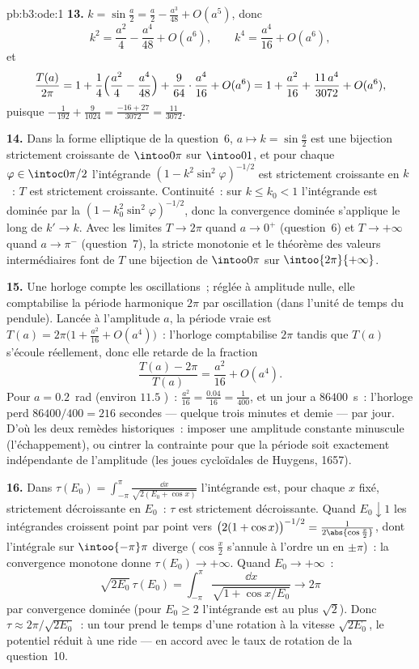 \begin{solution}{pb:b3:ode:1}
\textbf{13.} $k = \sin\frac a2 = \frac a2 - \frac{a^3}{48} +
O(a^5)$, donc
\[
k^2 = \frac{a^2}4 - \frac{a^4}{48} + O(a^6),
\qquad
k^4 = \frac{a^4}{16} + O(a^6) ,
\]
et
\[
\frac{T(a)}{2\pi} = 1 + \frac14\Bigl(\frac{a^2}4 -
\frac{a^4}{48}\Bigr) + \frac9{64}\cdot\frac{a^4}{16} +
O(a^6)
= 1 + \frac{a^2}{16} + \frac{11\,a^4}{3072} + O(a^6) ,
\]
puisque $-\frac1{192} + \frac9{1024} = \frac{-16 + 27}{3072}
= \frac{11}{3072}$.

\textbf{14.} Dans la forme elliptique de la question~6, $a
\mapsto k = \sin\frac a2$ est une bijection 
strictement croissante de $\intoo0\pi$ sur $\intoo01$, et
pour chaque $\varphi \in \intoc0{\pi/2}$ l'intégrande $(1 -
k^2\sin^2\varphi)^{-1/2}$ est strictement croissante en
$k$~: $T$ est strictement croissante. Continuité~: sur $k
\leq k_0 < 1$ l'intégrande est dominée par la  $(1 -
k_0^2\sin^2\varphi)^{-1/2}$, donc la convergence dominée
s'applique le long de $k' \to k$. Avec les limites $T \to
2\pi$ quand $a \to 0^+$ (question~6) et $T \to +\infty$ quand
$a \to \pi^-$ (question~7), la stricte monotonie et le
théorème des valeurs intermédiaires font de $T$ une bijection
de $\intoo0\pi$ sur $\intoo{2\pi}{+\infty}$.

\textbf{15.} Une horloge compte les oscillations~; réglée à
amplitude nulle, elle comptabilise la période harmonique
$2\pi$ par oscillation (dans l'unité de temps du pendule).
Lancée à l'amplitude $a$, la période vraie est $T(a) =
2\pi\bigl(1 + \frac{a^2}{16} + O(a^4)\bigr)$~: l'horloge
comptabilise $2\pi$ tandis que $T(a)$ s'écoule réellement,
donc elle retarde de la fraction
\[
\frac{T(a) - 2\pi}{T(a)} = \frac{a^2}{16} + O(a^4) .
\]
Pour $a = 0.2$~rad (environ $11.5$ )~: $\frac{a^2}{16}
= \frac{0.04}{16} = \frac1{400}$, et un jour a $86400$~s~:
l'horloge perd $86400/400 = 216$ secondes --- quelque trois
minutes et demie --- par jour. D'où les deux remèdes
historiques~: imposer une amplitude constante minuscule
(l'échappement), ou cintrer la contrainte pour que la période
soit exactement indépendante de l'amplitude (les joues
cycloïdales de Huygens, 1657).

\textbf{16.} Dans $\tau(E_0) = \int_{-\pi}^{\pi}\frac{\dd
x}{\sqrt{2(E_0 + \cos x)}}$ l'intégrande est, pour chaque
$x$ fixé, strictement décroissante en $E_0$~: $\tau$ est
strictement décroissante. Quand $E_0 \downarrow 1$ les
intégrandes croissent point par point vers $\bigl(2(1 + \cos
x)\bigr)^{-1/2} = \frac1{2\abs{\cos\frac x2}}$, dont
l'intégrale sur $\intoo{-\pi}\pi$ diverge ($\cos\frac x2$
s'annule à l'ordre un en $\pm\pi$)~: la convergence monotone
donne $\tau(E_0) \to +\infty$. Quand $E_0 \to +\infty$~:
\[
\sqrt{2E_0}\,\tau(E_0) = \int_{-\pi}^{\pi}
\frac{\dd x}{\sqrt{1 + \cos x/E_0}} \longrightarrow 2\pi
\]
par convergence dominée (pour $E_0 \geq 2$ l'intégrande est
au plus $\sqrt2$). Donc $\tau \approx 2\pi/\sqrt{2E_0}$~: un
tour prend le temps d'une rotation  à la vitesse
$\sqrt{2E_0}$, le potentiel réduit à une ride --- en accord
avec le taux de rotation de la question~10.


\end{solution}
